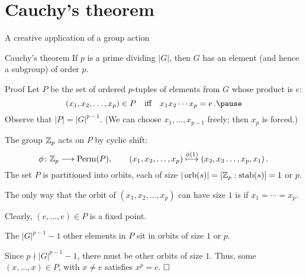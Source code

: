 \documentclass[8pt]{beamer}
\newcommand{\Pause}{\pause}      %
\begin{document}
\section*{Cauchy's theorem}
\begin{frame}{A creative application of a group action}

  \begin{block}{Cauchy's theorem} 
    If $p$ is a prime dividing $|G|$, then $G$ has an element (and
    hence a subgroup) of order $p$.
  \end{block}
  
  \begin{exampleblock}{Proof} \Pause
    Let $P$ be the set of ordered $p$-tuples of
    elements from $G$ whose product is $e$: \vspace{-1mm}
    \[
    (x_1,x_2,\dots,x_p)\in P\quad\mbox{iff}\quad x_1x_2\cdots
    x_p=e\,. \Pause
    \]
    Observe that $|P|=|G|^{p-1}$. (We can choose
    $x_1,\dots,x_{p-1}$ freely; then $x_p$ is forced.)
    
    \medskip 
    
    The group $\mathbb{Z}_p$ acts on $P$ by cyclic shift: \vspace{-2
      mm}
    \[
    \phi\colon\Z_p\longrightarrow\Perm(P),\qquad
    (x_1,x_2,\dots,x_p)\stackrel{\phi(1)}{\longmapsto}
    (x_2,x_3\dots,x_p,x_1)\,. %
    \]
    \Pause The set $P$ is partitioned into orbits, each of size
    $|\operatorname{orb}(s)|=[\mathbb{Z}_p:\operatorname{stab}(s)]=1$ or $p$.
        
    \medskip
    
    The only way that the orbit of $(x_1,x_2,\dots,x_p)$
    can have size $1$ is if $x_1=\cdots=x_p$.

    \Pause\medskip

    Clearly, $(e,\dots,e)\in P$ is a fixed point.
    
    \Pause\medskip
    
    The $|G|^{p-1}-1$ other elements in $P$ sit in orbits of size $1$
    or $p$.
    
    \medskip
    
    Since $p\nmid |G|^{p-1}-1$, there must be other orbits of size
    $1$. \Pause Thus, some $(x,\dots,x)\in P$, with $x\neq e$ satisfies
    $x^p=e$. $\hfill\Box$
  \end{exampleblock}
  
\end{frame}

\end{document}
